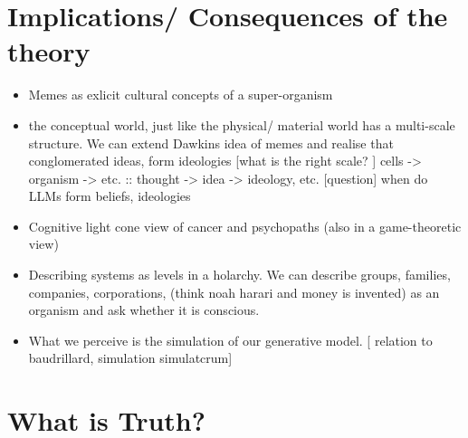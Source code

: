 \section{Implications/ Consequences of the theory}
\begin{itemize}
    \item Memes as exlicit cultural concepts of a super-organism
    \item the conceptual world, just like the physical/ material world has a multi-scale structure. We can extend Dawkins idea of memes and realise that conglomerated ideas, form ideologies [what is the right scale? ] cells -> organism -> etc. :: thought -> idea -> ideology, etc. [question] when do LLMs form beliefs, ideologies
    \item Cognitive light cone view of cancer and psychopaths (also in a game-theoretic view)
    \item Describing systems as levels in a holarchy. We can describe groups, families, companies, corporations, (think noah harari and money is invented) as an organism and ask whether it is conscious. 
    \item What we perceive is the simulation of our generative model. [ relation to baudrillard, simulation simulatcrum]
\end{itemize}



\section{What is Truth?}


